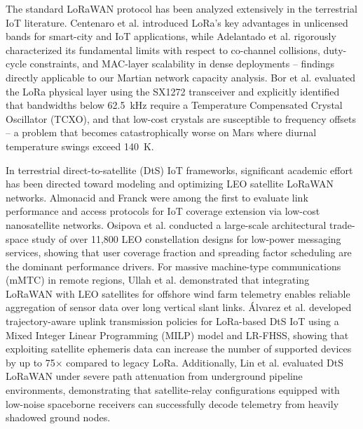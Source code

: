 \documentclass[journal,10pt,doublecolumn]{IEEEtran}
\begin{document}
The standard LoRaWAN protocol has been analyzed extensively in the terrestrial IoT literature. Centenaro et al. \cite{centenaro2016lora} introduced LoRa's key advantages in unlicensed bands for smart-city and IoT applications, while Adelantado et al. \cite{adelantado2017understanding} rigorously characterized its fundamental limits with respect to co-channel collisions, duty-cycle constraints, and MAC-layer scalability in dense deployments -- findings directly applicable to our Martian network capacity analysis. Bor et al. \cite{bor2016lora} evaluated the LoRa physical layer using the SX1272 transceiver and explicitly identified that bandwidths below 62.5~kHz require a Temperature Compensated Crystal Oscillator (TCXO), and that low-cost crystals are susceptible to frequency offsets -- a problem that becomes catastrophically worse on Mars where diurnal temperature swings exceed 140~K.

In terrestrial direct-to-satellite (DtS) IoT frameworks, significant academic effort has been directed toward modeling and optimizing LEO satellite LoRaWAN networks. Almonacid and Franck \cite{almonacid2017extending} were among the first to evaluate link performance and access protocols for IoT coverage extension via low-cost nanosatellite networks. Osipova et al. \cite{osipova2025architecting} conducted a large-scale architectural trade-space study of over 11,800 LEO constellation designs for low-power messaging services, showing that user coverage fraction and spreading factor scheduling are the dominant performance drivers. For massive machine-type communications (mMTC) in remote regions, Ullah et al. \cite{windfarm2022} demonstrated that integrating LoRaWAN with LEO satellites for offshore wind farm telemetry enables reliable aggregation of sensor data over long vertical slant links. Álvarez et al. \cite{alvarez2022uplink} developed trajectory-aware uplink transmission policies for LoRa-based DtS IoT using a Mixed Integer Linear Programming (MILP) model and LR-FHSS, showing that exploiting satellite ephemeris data can increase the number of supported devices by up to 75$\times$ compared to legacy LoRa. Additionally, Lin et al. \cite{underground2025} evaluated DtS LoRaWAN under severe path attenuation from underground pipeline environments, demonstrating that satellite-relay configurations equipped with low-noise spaceborne receivers can successfully decode telemetry from heavily shadowed ground nodes.
\end{document}
